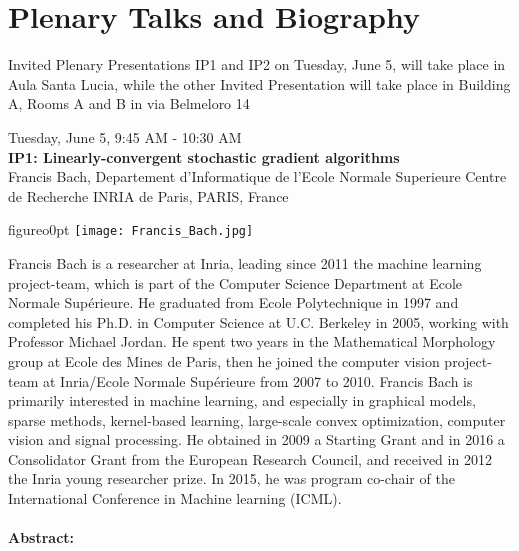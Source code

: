 
\chapter*{Plenary Talks and Biography}
{\small{Invited Plenary Presentations  IP1 and IP2 on Tuesday, June 5, will take place in Aula Santa Lucia, while the other Invited Presentation will take place in Building A, Rooms A and B in via Belmeloro 14}}
\newpage\vspace{2cm}
\begin{center}{\Large{
Tuesday, June 5, 9:45 AM - 10:30 AM \\
\textbf{IP1: Linearly-convergent stochastic gradient algorithms}\\
Francis Bach, Departement d'Informatique de l'Ecole Normale Superieure Centre de Recherche INRIA de Paris, PARIS, France}}
\end{center}
\vspace{1cm}

\begin{wrapfloat}{figure}{o}{0pt}
\texttt{[image: Francis\_Bach.jpg]}
\end{wrapfloat}

Francis Bach is a researcher at Inria, leading since 2011 the machine learning project-team, which is part of the Computer Science Department at Ecole Normale Sup\'erieure. He graduated from Ecole Polytechnique in 1997 and completed his Ph.D. in Computer Science at U.C. Berkeley in 2005, working with Professor Michael Jordan. He spent two years in the Mathematical Morphology group at Ecole des Mines de Paris, then he joined the computer vision project-team at Inria/Ecole Normale Sup\'erieure from 2007 to 2010. Francis Bach is primarily interested in machine learning, and especially in graphical models, sparse methods, kernel-based learning, large-scale convex optimization, computer vision and signal processing. He obtained in 2009 a Starting Grant and in 2016 a Consolidator Grant from the European Research Council, and received in 2012 the Inria young researcher prize. In 2015, he was program co-chair of the International Conference in Machine learning (ICML).\\\\

\textbf{Abstract:}\\

